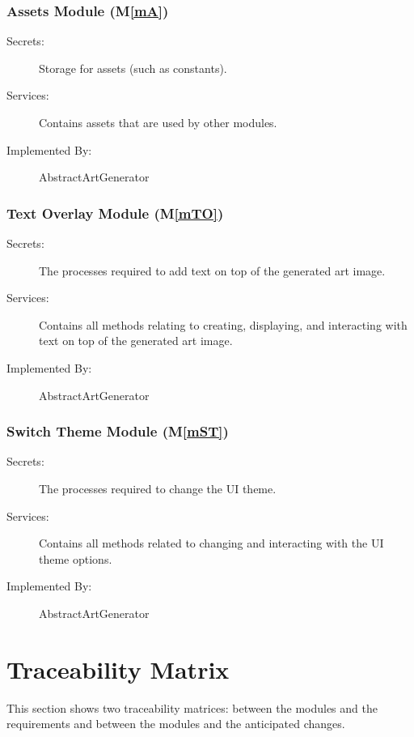 \documentclass[12pt, titlepage]{article}
\newcommand{\mref}[1]{M\ref{#1}}
\begin{document}
\subsubsection{Assets Module (\mref{mA})}

\begin{description}
\item[Secrets:] Storage for assets (such as constants).
\item[Services:] Contains assets that are used by other modules.
\item[Implemented By:] AbstractArtGenerator
\end{description}

\color{red}
\subsubsection{Text Overlay Module (\mref{mTO})}

\begin{description}
\item[Secrets:] The processes required to add text on top of the generated art image.
\item[Services:] Contains all methods relating to creating, displaying, and interacting with text on top of the generated art image.
\item[Implemented By:] AbstractArtGenerator
\end{description}

\subsubsection{Switch Theme Module (\mref{mST})}

\begin{description}
\item[Secrets:] The processes required to change the UI theme.
\item[Services:] Contains all methods related to changing and interacting with the UI theme options.
\item[Implemented By:] AbstractArtGenerator
\end{description}
\color{black}

\section{Traceability Matrix} \label{SecTM}

This section shows two traceability matrices: between the modules and the
requirements and between the modules and the anticipated changes.
\end{document}
